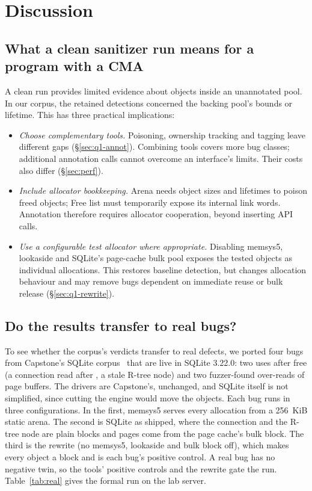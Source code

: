 \FloatBarrier
{}
\section{Discussion}
\label{sec:discussion}

\subsection{What a clean sanitizer run means for a program with a CMA}

A clean run provides limited evidence about objects inside an unannotated pool. In our corpus, the retained detections concerned the backing pool's bounds or lifetime. This has three practical implications:
\begin{itemize}
\item \emph{Choose complementary tools.} Poisoning, ownership tracking and tagging leave different gaps (\S\ref{sec:q1-annot}). Combining tools covers more bug classes; additional annotation calls cannot overcome an interface's limits. Their costs also differ (\S\ref{sec:perf}).
\item \emph{Include allocator bookkeeping.} Arena needs object sizes and lifetimes to poison freed objects; Free list must temporarily expose its internal link words. Annotation therefore requires allocator cooperation, beyond inserting API calls.
\item \emph{Use a configurable test allocator where appropriate.} Disabling memsys5, lookaside and SQLite's page-cache bulk pool exposes the tested objects as individual  allocations. This restores baseline detection, but changes allocation behaviour and may remove bugs dependent on immediate reuse or bulk release (\S\ref{sec:q1-rewrite}).
\end{itemize}

\subsection{Do the results transfer to real bugs?}
\label{sec:tier2}

To see whether the corpus's verdicts transfer to real defects, we ported four bugs from Capstone's SQLite corpus~\cite{capstone} that are live in SQLite 3.22.0: two uses after free (a connection read after , a stale R-tree node) and two fuzzer-found over-reads of page buffers. The drivers are Capstone's, unchanged, and SQLite itself is not simplified, since cutting the engine would move the objects. Each bug runs in three configurations. In the first, memsys5 serves every allocation from a 256~KiB static arena. The second is SQLite as shipped, where the connection and the R-tree node are plain  blocks and pages come from the page cache's bulk block. The third is the rewrite (no memsys5, lookaside and bulk block off), which makes every object a  block and is each bug's positive control. A real bug has no negative twin, so the tools' positive controls and the rewrite gate the run. Table~\ref{tab:real} gives the formal run on the lab server.

